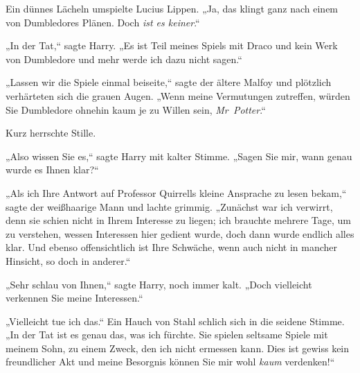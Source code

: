 Ein dünnes Lächeln umspielte Lucius Lippen. „Ja, das klingt ganz nach einem von Dumbledores Plänen. Doch \emph{ist es keiner}.“

„In der Tat,“ sagte Harry. „Es ist Teil meines Spiels mit Draco und kein Werk von Dumbledore und mehr werde ich dazu nicht sagen.“

„Lassen wir die Spiele einmal beiseite,“ sagte der ältere Malfoy und plötzlich verhärteten sich die grauen Augen. „Wenn meine Vermutungen zutreffen, würden Sie Dumbledore ohnehin kaum je zu Willen sein, \emph{Mr~Potter}.“

Kurz herrschte Stille.

„Also wissen Sie es,“ sagte Harry mit kalter Stimme. „Sagen Sie mir, wann genau wurde es Ihnen klar?“

„Als ich Ihre Antwort auf Professor Quirrells kleine Ansprache zu lesen bekam,“ sagte der weißhaarige Mann und lachte grimmig. „Zunächst war ich verwirrt, denn sie schien nicht in Ihrem Interesse zu liegen; ich brauchte mehrere Tage, um zu verstehen, wessen Interessen hier gedient wurde, doch dann wurde endlich alles klar. Und ebenso offensichtlich ist Ihre Schwäche, wenn auch nicht in mancher Hinsicht, so doch in anderer.“

„Sehr schlau von Ihnen,“ sagte Harry, noch immer kalt. „Doch vielleicht verkennen Sie meine Interessen.“

„Vielleicht tue ich das.“ Ein Hauch von Stahl schlich sich in die seidene Stimme. „In der Tat ist es genau das, was ich fürchte. Sie spielen seltsame Spiele mit meinem Sohn, zu einem Zweck, den ich nicht ermessen kann. Dies ist gewiss kein freundlicher Akt und meine Besorgnis können Sie mir wohl \emph{kaum} verdenken!“

